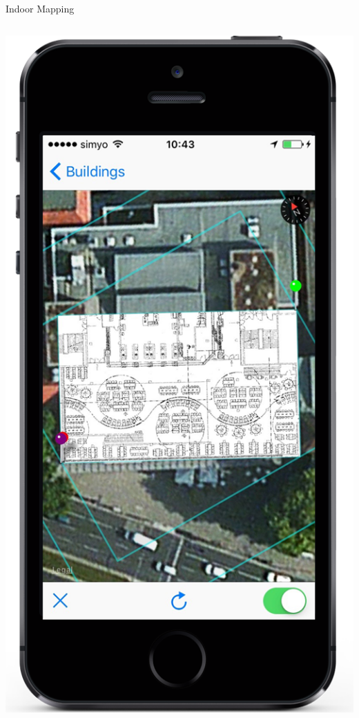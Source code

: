 \documentclass[11pt]{beamer}
\begin{document}
\begin{frame}{Indoor Mapping}
\begin{columns}[T]
\begin{column}{.4\textwidth}
  \includegraphics[scale=0.25]{mapsecondstep}
  \end{column}
\end{columns}

\end{frame}
\end{document}
